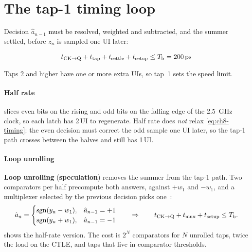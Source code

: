 \section{The tap-1 timing loop}\label{sec:dfe-timing}

Decision $\hat a_{n-1}$ must be resolved, weighted and subtracted, and the summer settled, before $z_n$ is sampled one UI later:

\begin{keyeq}
\begin{equation}
  t_\mathrm{CK\to Q}+t_\mathrm{tap}+t_\mathrm{settle}+t_\mathrm{setup}\le\Tb=\qty{200}{\pico\second}
  \label{eq:ch8-timing}
\end{equation}
\end{keyeq}

Taps 2 and higher have one or more extra UIs, so tap~1 sets the speed limit.

\paragraph{Half rate} \OS{} slices even bits on the rising and odd bits on the falling edge of the \qty{2.5}{\giga\hertz} clock, so each latch has 2\,UI to regenerate. Half rate does \emph{not} relax \cref{eq:ch8-timing}: the even decision must correct the odd sample one UI later, so the tap-1 path crosses between the halves and still has 1\,UI.

\paragraph{Loop unrolling} \textbf{Loop unrolling} (\textbf{speculation}) removes the summer from the tap-1 path. Two comparators per half precompute both answers, against $+w_1$ and $-w_1$, and a multiplexer selected by the previous decision picks one~\cite{palermo720eq}:
\begin{equation}
  \hat a_n=\begin{cases}\operatorname{sgn}(y_n-w_1), & \hat a_{n-1}=+1\\ \operatorname{sgn}(y_n+w_1), & \hat a_{n-1}=-1\end{cases}
  \qquad\Rightarrow\qquad t_\mathrm{CK\to Q}+t_\mathrm{mux}+t_\mathrm{setup}\le T_\mathrm{b} .
  \label{eq:ch8-unroll}
\end{equation}
 shows the half-rate version. The cost is $2^N$ comparators for $N$ unrolled taps, twice the load on the CTLE, and taps that live in comparator thresholds.

